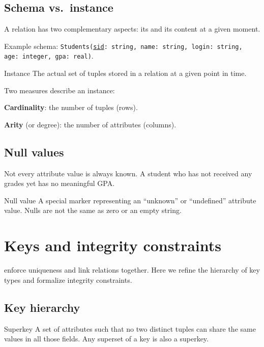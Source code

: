 \documentclass[../../dis.tex]{subfiles}
\begin{document}
\subsection{Schema vs.\ instance}
A relation has two complementary aspects: its  and its content at a given moment.

Example schema: \texttt{Students(\underline{sid}: string, name: string, login: string, age: integer, gpa: real)}.

\begin{concept}{Instance}
The actual set of tuples stored in a relation at a given point in time.
\end{concept}

Two measures describe an instance:
\begin{dashlist}
    \item \textbf{Cardinality}: the number of tuples (rows).
    \item \textbf{Arity} (or degree): the number of attributes (columns).
\end{dashlist}

\subsection{Null values}
Not every attribute value is always known. A student who has not received any grades yet has no meaningful GPA.

\begin{concept}{Null value}
A special marker representing an ``unknown'' or ``undefined'' attribute value. Nulls are not the same as zero or an empty string.
\end{concept}

\section{Keys and integrity constraints}
 enforce uniqueness and link relations together. Here we refine the hierarchy of key types and formalize integrity constraints.

\subsection{Key hierarchy}

\begin{concept}{Superkey}
A set of attributes such that no two distinct tuples can share the same values in all those fields. Any superset of a key is also a superkey.
\end{concept}
\end{document}
